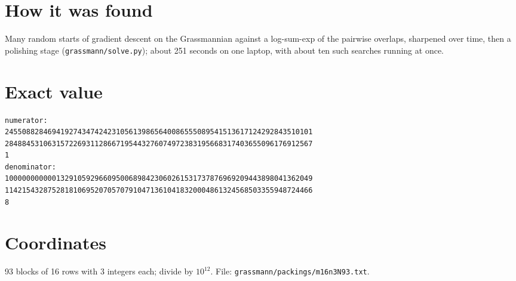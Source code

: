 \documentclass[11pt,a4paper]{article}
\begin{document}
\section{How it was found}
Many random starts of gradient descent on the Grassmannian against a log-sum-exp of the pairwise overlaps, sharpened over time, then a polishing stage (\texttt{grassmann/solve.py}); about 251 seconds on one laptop, with about ten such searches running at once.


\appendix
\section{Exact value}
{\small
\begin{verbatim}
numerator:
245508828469419274347424231056139865640086555089541513617124292843510101
284884531063157226931128667195443276074972383195668317403655096176912567
1
denominator:
100000000000132910592966095006898423060261531737876969209443898041362049
114215432875281810695207057079104713610418320004861324568503355948724466
8
\end{verbatim}}

\section{Coordinates}
93 blocks of 16 rows with 3 integers each; divide by $10^{12}$. File: \texttt{grassmann/packings/m16n3N93.txt}.
{\tiny
\begin{multicols}{3}
\end{multicols}}
\end{document}
